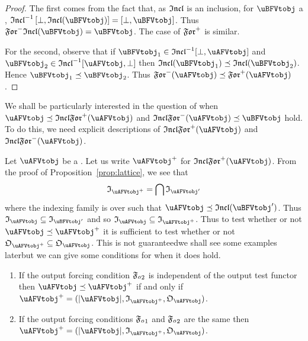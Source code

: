 \documentclass[%
12pt,%
arxiv,%
defaults
]{myclass}
\begin{document}
\begin{proof}
The first comes from the fact that, as \(\incfunc\) is an inclusion, for \(\uBFVtobj\) a \uBFVtobjalt, \(\incfunc^{-1} \left[\bot, \incfunc(\uBFVtobj)\right] = \left[\bot, \uBFVtobj\right]\).
Thus \(\Jforfunc \incfunc(\uBFVtobj) = \uBFVtobj\).
The case of \(\Mforfunc\) is similar.

For the second, observe that if \(\uBFVtobj_1 \in \incfunc^{-1} [\bot, \uAFVtobj]\) and \(\uBFVtobj_2 \in \incfunc^{-1} [\uAFVtobj, \bot]\) then \(\incfunc(\uBFVtobj_1) \preceq \incfunc(\uBFVtobj_2)\).
Hence \(\uBFVtobj_1 \preceq \uBFVtobj_2\).
Thus \(\Jforfunc(\uAFVtobj) \preceq \Mforfunc(\uAFVtobj)\).
\end{proof}

We shall be particularly interested in the question of when \(\uAFVtobj \preceq \incfunc \Mforfunc(\uAFVtobj)\) and \(\incfunc \Jforfunc(\uAFVtobj) \preceq \uBFVtobj\) hold.
To do this, we need explicit descriptions of \(\incfunc \Mforfunc(\uAFVtobj)\) and \(\incfunc \Jforfunc(\uAFVtobj)\).

Let \(\uAFVtobj\) be a \uAFVtobjalt.
Let us write \(\mMo{\uAFVtobj}\) for \(\incfunc\Mforfunc(\uAFVtobj)\).
From the proof of Proposition~\ref{prop:lattice}, we see that
%
\[
  \itest_{\mMo{\uAFVtobj}} = \bigcap \itest_{\uAFVtobj'}
\]
%
where the indexing family is over \uBFVtobjalts[\uBFVtobj'] such that \(\uAFVtobj \preceq \incfunc(\uBFVtobj')\).
Thus \(\itest_{\uAFVtobj} \subseteq \itest_{\uBFVtobj'}\) and so \(\itest_{\uAFVtobj} \subseteq \itest_{\mMo{\uAFVtobj}}\).
Thus to test whether or not \(\uAFVtobj \preceq \mMo{\uAFVtobj}\) it is sufficient to test whether or not \(\otest_{\mMo{\uAFVtobj}} \subseteq \otest_{\uAFVtobj}\).
This is not guaranteed\emhyp{}we shall see some examples later\emhyp{}but we can give some conditions for when it does hold.

\begin{proposition}
\label{prop:foradj}
\begin{enumerate}
\item If the output forcing condition \(\mBo{\oforce}\) is independent of the output test functor then \(\uAFVtobj \preceq \mMo{\uAFVtobj}\) if and only if \(\mMo{\uAFVtobj} = (\forfunc[\uAFVtobj], \itest_{\mMo{\uAFVtobj}}, \otest_{\uAFVtobj})\).
\item If the output forcing conditions \(\mAo{\oforce}\) and \(\mBo{\oforce}\) are the same then \(\mMo{\uAFVtobj} = (\forfunc[\uAFVtobj], \itest_{\mMo{\uAFVtobj}}, \otest_{\uAFVtobj})\).
\end{enumerate}
\end{proposition}
\end{document}

